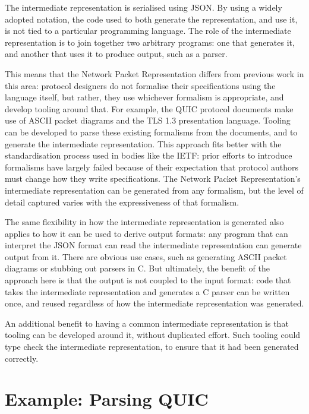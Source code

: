 \documentclass[10pt,sigconf]{acmart}
\begin{document}
The intermediate representation is serialised using JSON. By using a widely adopted
notation, the code used to both generate the representation, and use it, is not tied to a
particular programming language. The role of the intermediate representation is to join
together two arbitrary programs: one that generates it, and another that uses it to
produce output, such as a parser.

This means that the Network Packet Representation differs from previous work in this area:
protocol designers do not formalise their specifications using the language itself, but
rather, they use whichever formalism is appropriate, and develop tooling around that. For
example, the QUIC protocol documents make use of ASCII packet diagrams and the TLS 1.3
presentation language. Tooling can be developed to parse these existing formalisms from
the documents, and to generate the intermediate representation. This approach fits better
with the standardisation process used in bodies like the IETF: prior efforts to introduce
formalisms have largely failed because of their expectation that protocol authors must
change how they write specifications. The Network Packet Representation's intermediate
representation can be generated from any formalism, but the level of detail captured
varies with the expressiveness of that formalism.

The same flexibility in how the intermediate representation is generated also applies to
how it can be used to derive output formats: any program that can interpret the JSON
format can read the intermediate representation can generate output from it. There are
obvious use cases, such as generating ASCII packet diagrams or stubbing out parsers in C.
But ultimately, the benefit of the approach here is that the output is not coupled to the
input format: code that takes the intermediate representation and generates a C parser can
be written once, and reused regardless of how the intermediate representation was
generated.

An additional benefit to having a common intermediate representation is that tooling can
be developed around it, without duplicated effort. Such tooling could type check the
intermediate representation, to ensure that it had been generated correctly.

\section{Example: Parsing QUIC}
\label{sec:casestudy}
\end{document}
